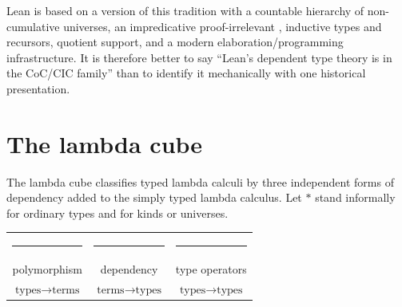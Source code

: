 \documentclass[10pt,letterpaper,oneside,openany]{report}
\newcommand{\term}[1]{\texttt{\detokenize{#1}}}
\begin{document}
Lean is based on a version of this tradition with a countable hierarchy of non-cumulative universes, an impredicative proof-irrelevant \term{Prop}, inductive types and recursors, quotient support, and a modern elaboration/programming infrastructure.  It is therefore better to say ``Lean's dependent type theory is in the CoC/CIC family'' than to identify it mechanically with one historical presentation.

\section{The lambda cube}

The lambda cube classifies typed lambda calculi by three independent forms of dependency added to the simply typed lambda calculus.  Let $*$ stand informally for ordinary types and \term{□} for kinds or universes.

\begin{center}

\vspace{0.25em}
{\footnotesize\sffamily
\begin{tabular}{@{}ccc@{}}
\textcolor{Blue}{\rule{1.7em}{1.5pt}} &
\textcolor{Sage}{\rule{1.7em}{1.5pt}} &
\textcolor{Gold}{\rule{1.7em}{1.5pt}} \\
polymorphism & dependency & type operators \\
$\text{types}\to\text{terms}$ & $\text{terms}\to\text{types}$ & $\text{types}\to\text{types}$
\end{tabular}}
\end{center}
\end{document}
